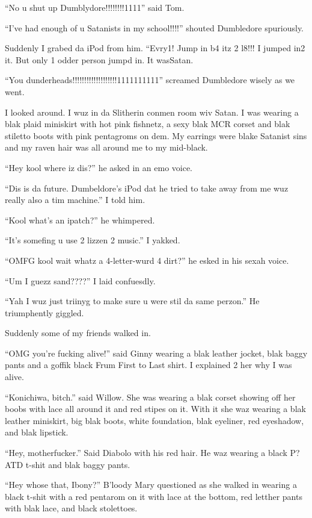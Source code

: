 \enquote{No u shut up Dumblydore!!!!!!!!1111} said Tom.

\enquote{I've had enough of u Satanists in my school!!!!} shouted Dumbledore spuriously.

Suddenly I grabed da iPod from him. ``Evry1! Jump in b4 itz 2 l8!!! I jumped in2 it. But only 1 odder person jumpd in. It was\dotfill Satan.

\enquote{You dunderheads!!!!!!!!!!!!!!!!!!!1111111111} screamed Dumbledore wisely as we went.

I looked around. I wuz in da Slitherin conmen room wiv Satan. I was wearing a blak plaid miniskirt with hot pink fishnetz, a sexy blak MCR corset and blak stiletto boots with pink pentagroms on dem. My earrings were blake Satanist sins and my raven hair was all around me to my mid-black.

\enquote{Hey kool where iz dis?} he asked in an emo voice.

\enquote{Dis is da future. Dumbeldore's iPod dat he tried to take away from me wuz really also a tim machine.} I told him.

\enquote{Kool what's an ipatch?} he whimpered.

\enquote{It's somefing u use 2 lizzen 2 music.} I yakked.

\enquote{OMFG kool wait whatz a 4-letter-wurd 4 dirt?} he esked in his sexah voice.

\enquote{Um I guezz sand????} I laid confuesdly.

\enquote{Yah I wuz just triinyg to make sure u were stil da same perzon.} He triumphently giggled.

Suddenly some of my friends walked in.

\enquote{OMG you're fucking alive!} said Ginny wearing a blak leather jocket, blak baggy pants and a goffik black Frum First to Last shirt. I explained 2 her why I was alive.

\enquote{Konichiwa, bitch.} said Willow. She was wearing a blak corset showing off her boobs with lace all around it and red stipes on it. With it she waz wearing a blak leather miniskirt, big blak boots, white foundation, blak eyeliner, red eyeshadow, and blak lipstick.

\enquote{Hey, motherfucker.} Said Diabolo with his red hair. He waz wearing a black P?ATD t-shit and blak baggy pants.

\begin{sloppypar}
    \enquote{Hey whose that, Ibony?} B'loody Mary questioned as she walked in wearing a black t-shit with a red pentarom on it with lace at the bottom, red letther pants with blak lace, and black stolettoes.
\end{sloppypar}

